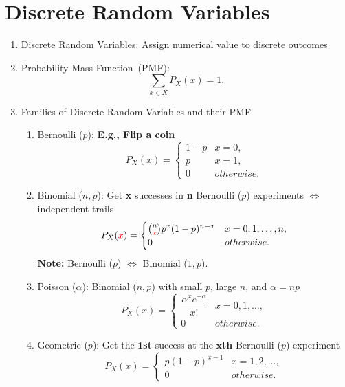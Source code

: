 \chapter{Discrete Random Variables}
\begin{enumerate}
    \item Discrete Random Variables: Assign numerical value to discrete outcomes
    \item Probability Mass Function~(PMF): \[\sum_{x\in X}P_X(x)=1.\]
    \item Families of Discrete Random Variables and their PMF{
        \begin{enumerate}
            \item Bernoulli ($p$): \textbf{E.g., Flip a coin}{
                \[ P_X(x) =
                \begin{cases}
                    1-p & x=0, \\
                    p   & x=1, \\
                    0   & otherwise.
                \end{cases} \]
            }
            \item Binomial ($n, p$): Get \textbf{x} successes in \textbf{n} Bernoulli ($p$) experiments $\iff$ independent trails{
                \[P_X(\textcolor{red}{x}) = {
                    \begin{cases}
                        \binom{n}{\textcolor{red}{x}}p^x(1-p)^{n-x} & x=0,1,\ldots,n, \\
                        0 & otherwise.
                    \end{cases}
                }\]
                \textbf{Note:} Bernoulli ($p$) $\iff$ Binomial ($1, p$).
            }
            \item Poisson ($\alpha$): Binomial ($n, p$) with small $p$, large $n$, and $\alpha=np${
                \[ P_X(x) =
                \begin{cases}
                    \dfrac{\alpha^x e^{-\alpha}}{x!}   & x=0,1,\ldots, \\
                    0   & otherwise.
                \end{cases} \]
            }
            \item Geometric ($p$): Get the $\bm{1}$\textbf{st} success at the $\bm{x}$\textbf{th} Bernoulli ($p$) experiment {
                \[ P_X(x) =
                \begin{cases}
                    p(1-p)^{x-1} & x=1,2,\ldots, \\
                    0   & otherwise.

\end{cases}\]}
\end{enumerate}}
\end{enumerate}
